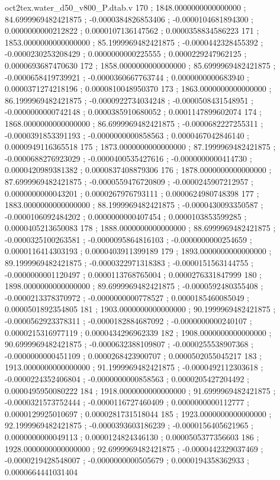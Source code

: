 \begin{filecontents}[overwrite]{oct2tex.water_d50_v800_P.dtab.v}
170 ; 1848.0000000000000000 ; 84.6999969482421875 ; -0.0000384826853406 ; -0.0000104681894300 ; 0.0000000000212822 ; 0.0000107136147562 ; 0.0000358834586223
171 ; 1853.0000000000000000 ; 85.1999969482421875 ; -0.0000442328455392 ; -0.0000230253208429 ; 0.0000000000225555 ; 0.0000229247962125 ; 0.0000693687470630
172 ; 1858.0000000000000000 ; 85.6999969482421875 ; -0.0000658419739921 ; -0.0000360667763744 ; 0.0000000000683940 ; 0.0000371274218196 ; 0.0000810048950370
173 ; 1863.0000000000000000 ; 86.1999969482421875 ; -0.0000922734034248 ; -0.0000508431548951 ; -0.0000000000742148 ; 0.0000385910680052 ; 0.0001147899602074
174 ; 1868.0000000000000000 ; 86.6999969482421875 ; -0.0000682227255311 ; -0.0000391853391193 ; -0.0000000000858563 ; 0.0000467042846140 ; 0.0000949116365518
175 ; 1873.0000000000000000 ; 87.1999969482421875 ; -0.0000688276923029 ; -0.0000400535427616 ; -0.0000000000414730 ; 0.0000420989381382 ; 0.0000837408879306
176 ; 1878.0000000000000000 ; 87.6999969482421875 ; -0.0000559476720809 ; -0.0000245907212957 ; 0.0000000000043201 ; 0.0000267976793111 ; 0.0000624980748398
177 ; 1883.0000000000000000 ; 88.1999969482421875 ; -0.0000430093350587 ; -0.0000106092484202 ; 0.0000000000407454 ; 0.0000103853599285 ; 0.0000405213650083
178 ; 1888.0000000000000000 ; 88.6999969482421875 ; -0.0000325100263581 ; -0.0000095864816103 ; -0.0000000000254659 ; 0.0000116414303193 ; 0.0000403911399189
179 ; 1893.0000000000000000 ; 89.1999969482421875 ; -0.0000322971318383 ; -0.0000151563144755 ; -0.0000000001120497 ; 0.0000113768765004 ; 0.0000276331847999
180 ; 1898.0000000000000000 ; 89.6999969482421875 ; -0.0000592480355408 ; -0.0000213378370972 ; -0.0000000000778527 ; 0.0000185460085049 ; 0.0000501892354805
181 ; 1903.0000000000000000 ; 90.1999969482421875 ; -0.0000562923378311 ; -0.0000182884687092 ; -0.0000000000240107 ; 0.0000215316977119 ; 0.0000434296962339
182 ; 1908.0000000000000000 ; 90.6999969482421875 ; -0.0000632388109807 ; -0.0000255538907368 ; -0.0000000000451109 ; 0.0000268423900707 ; 0.0000502055045217
183 ; 1913.0000000000000000 ; 91.1999969482421875 ; -0.0000492112303618 ; -0.0000224352406804 ; -0.0000000000858563 ; 0.0000205427204492 ; 0.0000495950080222
184 ; 1918.0000000000000000 ; 91.6999969482421875 ; -0.0000321573752444 ; -0.0000116727460409 ; 0.0000000000112777 ; 0.0000129925010697 ; 0.0000281731518044
185 ; 1923.0000000000000000 ; 92.1999969482421875 ; -0.0000393603186239 ; -0.0000156405621965 ; 0.0000000000049113 ; 0.0000124824346130 ; 0.0000505377356603
186 ; 1928.0000000000000000 ; 92.6999969482421875 ; -0.0000442329037469 ; -0.0000219428548007 ; -0.0000000000505679 ; 0.0000194358362933 ; 0.0000664441031404

\end{filecontents}
